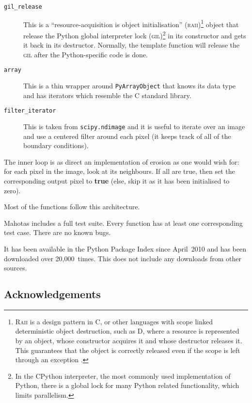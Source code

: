 \documentclass{article}
\newcommand*{\cpp}{{C\nolinebreak[4]\hspace{-.05em}\raisebox{.4ex}{\tiny\textbf{++}}}}
\let\code\texttt
\begin{document}
\begin{description}
\item[\code{gil\_release}] This is a ``resource-acquisition is object
initialisation'' (\textsc{raii})\footnote{\textsc{Raii} is a design pattern in
\cpp{}, or other languages with scope linked deterministic object destruction,
such as D, where a resource is represented by an object, whose constructor
acquires it and whose destructor releases it. This guarantees that the object
is correctly released even if the scope is left through an exception
\citep{Stroustrup1994}.} object that release the Python global interpreter lock
(\textsc{gil})\footnote{In the CPython interpreter, the most commonly used
implementation of Python, there is a global lock for many Python related
functionality, which limits parallelism.} in its constructor and gets it back
in its destructor. Normally, the template function will release the
\textsc{gil} after the Python-specific code is done.
\item[\code{array}] This is a thin wrapper around \code{PyArrayObject} that
knows its data type and has iterators which resemble the \cpp{} standard
library.
\item[\code{filter\_iterator}] This is taken from \code{scipy.ndimage} and it
is useful to iterate over an image and use a centered filter around each pixel
(it keeps track of all of the boundary conditions).
\end{description}

The inner loop is as direct an implementation of erosion as one would wish for:
for each pixel in the image, look at its neighbours. If all are true, then set
the corresponding output pixel to \textbf{true} (else, skip it as it has been
initialised to zero).

Most of the functions follow this architecture.

\medskip

Mahotas includes a full test suite. Every function has at least one
corresponding test case. There are no known bugs.

It has been available in the Python Package Index since April~2010 and has been
downloaded over 20,000~times. This does not include any downloads from other
sources.

\subsection*{Acknowledgements}
\end{document}
